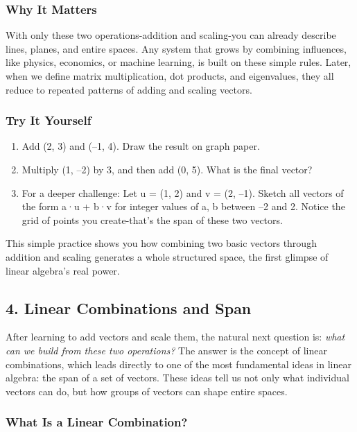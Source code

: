 \documentclass[
  letterpaper,
  DIV=11,
  numbers=noendperiod]{scrreprt}
\providecommand{\tightlist}{%
  \setlength{\itemsep}{0pt}\setlength{\parskip}{0pt}}
\begin{document}
\subsubsection{Why It Matters}\label{why-it-matters-2}

With only these two operations-addition and scaling-you can already
describe lines, planes, and entire spaces. Any system that grows by
combining influences, like physics, economics, or machine learning, is
built on these simple rules. Later, when we define matrix
multiplication, dot products, and eigenvalues, they all reduce to
repeated patterns of adding and scaling vectors.

\subsubsection{Try It Yourself}\label{try-it-yourself-2}

\begin{enumerate}
\def\labelenumi{\arabic{enumi}.}
\tightlist
\item
  Add (2, 3) and (--1, 4). Draw the result on graph paper.
\item
  Multiply (1, --2) by 3, and then add (0, 5). What is the final vector?
\item
  For a deeper challenge: Let u = (1, 2) and v = (2, --1). Sketch all
  vectors of the form a·u + b·v for integer values of a, b between --2
  and 2. Notice the grid of points you create-that's the span of these
  two vectors.
\end{enumerate}

This simple practice shows you how combining two basic vectors through
addition and scaling generates a whole structured space, the first
glimpse of linear algebra's real power.

\subsection{4. Linear Combinations and
Span}\label{linear-combinations-and-span}

After learning to add vectors and scale them, the natural next question
is: \emph{what can we build from these two operations?} The answer is
the concept of linear combinations, which leads directly to one of the
most fundamental ideas in linear algebra: the span of a set of vectors.
These ideas tell us not only what individual vectors can do, but how
groups of vectors can shape entire spaces.

\subsubsection{What Is a Linear
Combination?}\label{what-is-a-linear-combination}
\end{document}
